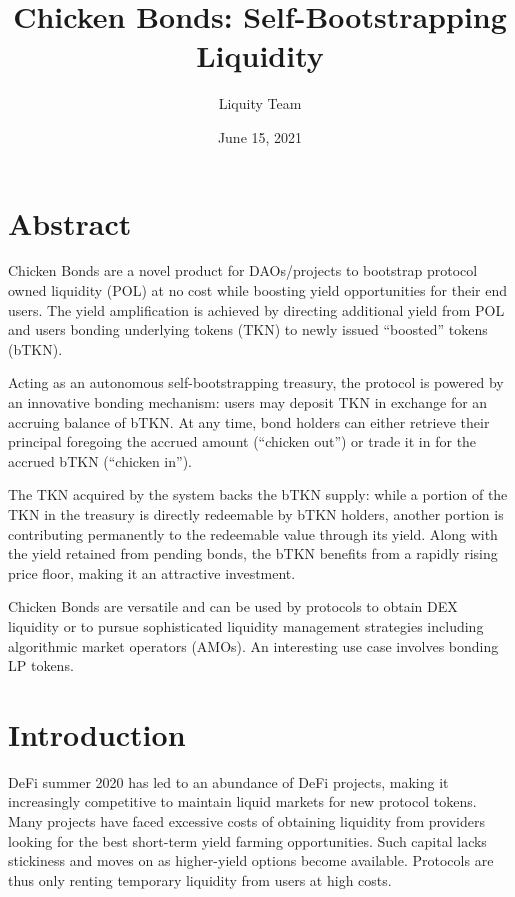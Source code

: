 \documentclass{article}
\begin{document}
\title{\textbf{Chicken Bonds: Self-Bootstrapping Liquidity}}
\author{Liquity Team}
\date{June 15, 2021}

\maketitle

\section*{Abstract}
Chicken Bonds are a novel product for DAOs/projects to bootstrap protocol owned liquidity (POL) at no cost while boosting yield opportunities for their end users. The yield amplification is achieved by directing additional yield from POL and users bonding underlying tokens (TKN) to newly issued “boosted” tokens (bTKN). 

Acting as an autonomous self-bootstrapping treasury, the protocol is powered by an innovative bonding mechanism: users may deposit TKN in exchange for an accruing balance of bTKN. At any time, bond holders can either retrieve their principal foregoing the accrued amount (“chicken out”) or trade it in for the accrued bTKN (“chicken in”).

The TKN acquired by the system backs the bTKN supply: while a portion of the TKN in the treasury is directly redeemable by bTKN holders, another portion is contributing permanently to the redeemable value through its yield. Along with the yield retained from pending bonds, the bTKN benefits from a rapidly rising price floor,  making it an attractive investment.

Chicken Bonds are versatile and can be used by protocols to obtain DEX liquidity or to pursue sophisticated liquidity management strategies including algorithmic market operators (AMOs). An interesting use case involves bonding LP tokens.

\tableofcontents

\section{Introduction}
DeFi summer 2020 has led to an abundance of DeFi projects, making it increasingly competitive to maintain liquid markets for new protocol tokens. Many projects have faced excessive costs of obtaining liquidity from providers looking for the best short-term yield farming opportunities. Such capital lacks stickiness and moves on as higher-yield options become available. Protocols are thus only renting temporary liquidity from users at high costs.
\end{document}

